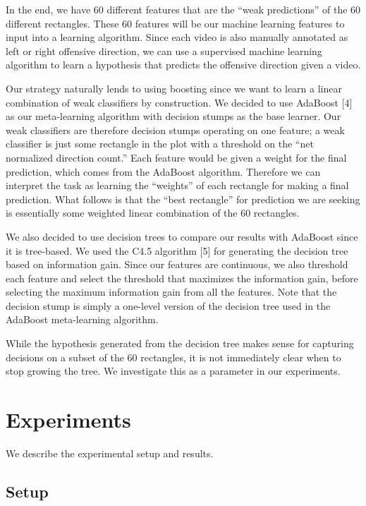 \documentclass{article} %
\begin{document}
In the end, we have 60 different features that are the ``weak predictions'' of the 60 different rectangles. These 60 features will be our machine learning features to input into a learning algorithm. Since each video is also manually annotated as left or right offensive direction, we can use a supervised machine learning algorithm to learn a hypothesis that predicts the offensive direction given a video.

Our strategy naturally lends to using boosting since we want to learn a linear combination of weak classifiers by construction. We decided to use AdaBoost [4] as our meta-learning algorithm with decision stumps as the base learner. Our weak classifiers are therefore decision stumps operating on one feature; a weak classifier is just some rectangle in the plot with a threshold on the ``net normalized direction count.'' Each feature would be given a weight for the final prediction, which comes from the AdaBoost algorithm. Therefore we can interpret the task as learning the ``weights'' of each rectangle for making a final prediction. What follows is that the ``best rectangle'' for prediction we are seeking is essentially some weighted linear combination of the 60 rectangles.

We also decided to use decision trees to compare our results with AdaBoost since it is tree-based. We used the C4.5 algorithm [5] for generating the decision tree based on information gain. Since our features are continuous, we also threshold each feature and select the threshold that maximizes the information gain, before selecting the maximum information gain from all the features. Note that the decision stump is simply a one-level version of the decision tree used in the AdaBoost meta-learning algorithm.

While the hypothesis generated from the decision tree makes sense for capturing decisions on a subset of the 60 rectangles, it is not immediately clear when to stop growing the tree. We investigate this as a parameter in our experiments.

\section{Experiments}

We describe the experimental setup and results.

\subsection{Setup}
\end{document}
